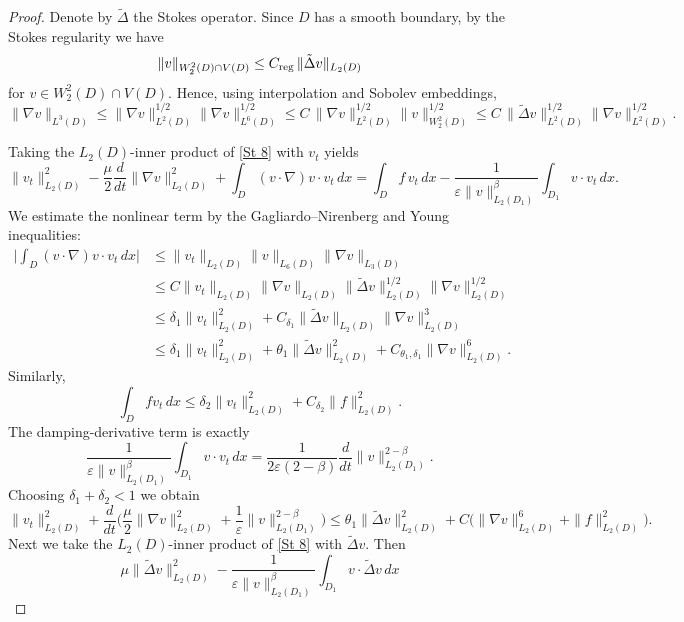 \documentclass[11pt]{article}
\begin{document}
\begin{proof} %
	Denote by $\tilde\Delta $ the Stokes operator.  
Since $D$ has a smooth boundary, by the Stokes regularity we have
	\[
	\|v\|_{W^2_2(D)\cap V(D)} \le C_{\rm reg}\,\|\tilde\Delta v\|_{L_2(D)}
	\]
for $v\in W^2_2(D)\cap V(D)$.
	Hence, using interpolation and Sobolev embeddings,
	\[
	\|\nabla v\|_{L^3(D)} \le \|\nabla v\|_{L^2(D)}^{1/2}\|\nabla v\|_{L^6(D)}^{1/2}
	\le C\,\|\nabla v\|_{L^2(D)}^{1/2}\|v\|_{W^2_2(D)}^{1/2}
	\le C\,\|\tilde\Delta v\|_{L^2(D)}^{1/2}\|\nabla v\|_{L^2(D)}^{1/2}.
	\]
	
	Taking the $L_2(D)$-inner product of \eqref{St 8} with $v_t$  yields
	\[
	\|v_t\|_{L_2(D)}^2 - \frac{\mu}{2}\frac{d}{dt}\|\nabla v\|_{L_2(D)}^2
	+ \int_D (v\cdot\nabla)v\cdot v_t\,dx
	= \int_D f\,v_t\,dx - \frac{1}{\varepsilon\|v\|_{L_2(D_1)}^\beta}\int_{D_1} v\cdot v_t\,dx.
	\]
We estimate the nonlinear term by the Gagliardo--Nirenberg and Young inequalities:
	\[
	\begin{aligned}
		\Big|\int_D (v\cdot\nabla)v\cdot v_t\,dx\Big|
		&\le \|v_t\|_{L_2(D)}\|v\|_{L_6(D)}\|\nabla v\|_{L_3(D)} \\
		&\le C\|v_t\|_{L_2(D)}\|\nabla v\|_{L_2(D)}\|\tilde\Delta v\|_{L_2(D)}^{1/2}\|\nabla v\|_{L_2(D)}^{1/2} \\
		&\le \delta_1\|v_t\|_{L_2(D)}^2 + C_{\delta_1}\|\tilde\Delta v\|_{L_2(D)}\|\nabla v\|_{L_2(D)}^3 \\
		&\le \delta_1\|v_t\|_{L_2(D)}^2 + \theta_1\|\tilde\Delta v\|_{L_2(D)}^2 + C_{\theta_1,{\delta_1}}\|\nabla v\|_{L_2(D)}^6.
	\end{aligned}
	\]
	Similarly,
	\[
	\int_D f v_t \,dx \le \delta_2\|v_t\|_{L_2(D)}^2 + C_{\delta_2}\|f\|_{L_2(D)}^2.
	\]
	The damping-derivative term is exactly
	\[
	\frac{1}{\varepsilon\|v\|_{L_2(D_1)}^\beta}\int_{D_1} v\cdot v_t\,dx
	= \frac{1}{2\varepsilon(2-\beta)}\frac{d}{dt}\|v\|_{L_2(D_1)}^{2-\beta}.
	\]
	Choosing $\delta_1+\delta_2<1$ we obtain
	\begin{equation}\label{St 17}
		\|v_t\|_{L_2(D)}^2 + \frac{d}{dt}\Big({\frac\mu2}\|\nabla v\|_{L_2(D)}^2 + \frac{1}{\varepsilon}\|v\|_{L_2(D_1)}^{2-\beta}\Big)
		\le \theta_1\|\tilde\Delta v\|_{L_2(D)}^2 + C\big(\|\nabla v\|_{L_2(D)}^6 + \|f\|_{L_2(D)}^2\big).
	\end{equation}
	Next we take the $L_2(D)$-inner product of \eqref{St 8} with $\tilde\Delta v$.
 Then
	\[
	{\mu}\|\tilde\Delta v\|_{L_2(D)}^2 - \frac{1}{\varepsilon\|v\|_{L_2(D_1)}^\beta}\int_{D_1} v\cdot\tilde\Delta v\,dx
\]
\end{proof}
\end{document}
